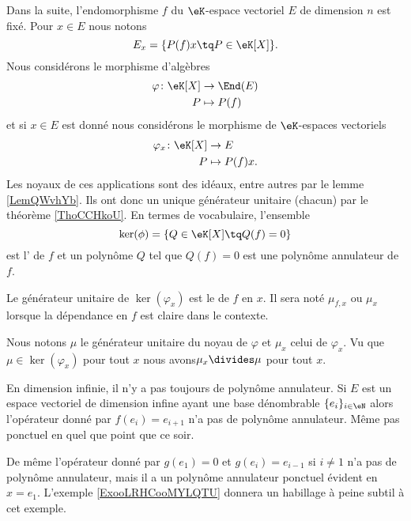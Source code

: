Dans la suite, l'endomorphisme \( f\) du \( \eK\)-espace vectoriel \( E\) de dimension \( n\) est fixé. Pour \( x\in E\) nous notons
\begin{equation}            \label{EqooOAYDooEpZELo}
    E_x=\{ P(f)x\tq P\in \eK[X] \}.
\end{equation}
Nous considérons le morphisme d'algèbres
\begin{equation}
    \begin{aligned}
        \varphi\colon \eK[X]&\to \End(E) \\
        P&\mapsto P(f) 
    \end{aligned}
\end{equation}
et si \( x\in E\) est donné nous considérons le morphisme de \( \eK\)-espaces vectoriels
\begin{equation}
    \begin{aligned}
        \varphi_x\colon \eK[X]&\to E \\
        P&\mapsto P(f)x. 
    \end{aligned}
\end{equation}
Les noyaux de ces applications sont des idéaux, entre autres par le lemme \ref{LemQWvhYb}. Ils ont donc un unique générateur unitaire (chacun) par le théorème \ref{ThoCCHkoU}. En termes de vocabulaire, l'ensemble
\begin{equation}
    \ker(\phi)=\{  Q\in\eK[X]\tq Q(f)=0  \}
\end{equation}
est l' de \( f\) et un polynôme \( Q\) tel que \( Q(f)=0\) est une polynôme annulateur de \( f\).

\begin{definition}
    Le générateur unitaire de \( \ker(\varphi_x)\) est le  de \( f\) en \( x\). Il sera noté \( \mu_{f,x}\) ou \( \mu_x\) lorsque la dépendance en \( f\) est claire dans le contexte.
\end{definition}
Nous notons \( \mu\) le générateur unitaire du noyau de \( \varphi\) et \( \mu_x\) celui de \( \varphi_x\). Vu que \( \mu\in\ker(\varphi_x)\) pour tout \( x\) nous avons\( \mu_x\divides \mu\) pour tout \( x\).

\begin{example}       \label{ExooDTUJooIMqSKn}
    En dimension infinie, il n'y a pas toujours de polynôme annulateur. Si \( E\) est un espace vectoriel de dimension infine ayant une base dénombrable \( \{ e_i \}_{i\in \eN}\) alors l'opérateur donné par \( f(e_i)=e_{i+1}\) n'a pas de polynôme annulateur. Même pas ponctuel en quel que point que ce soir.

    De même l'opérateur donné par \( g(e_1)=0\) et \( g(e_i)=e_{i-1}\) si \( i\neq 1\) n'a pas de polynôme annulateur, mais il a un polynôme annulateur ponctuel évident en \( x=e_1\). L'exemple \ref{ExooLRHCooMYLQTU} donnera un habillage à peine subtil à cet exemple.
\end{example}

